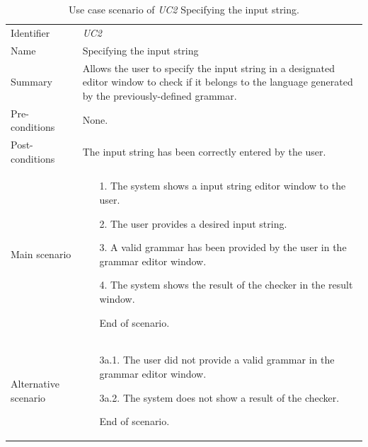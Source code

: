 \documentclass[english,engineering]{wizthesis}
\begin{document}
\begin{xltabular}{\textwidth}{@{}L{3cm}X@{}}
  \caption{Use case scenario of \emph{UC2} Specifying the input string.}
  \label{tab:uc2-scenario}\\
  \toprule
  \endfirsthead
  \endhead
  \endfoot
  \endlastfoot
  Identifier & \emph{UC2} \\
  \addlinespace[0.5em] Name & Specifying the input string \\
  \addlinespace[0.5em] Summary & Allows the user to specify the input string in
  a designated editor window to check if it belongs to the language generated by
  the previously-defined grammar. \\
  \addlinespace[0.5em] Pre-conditions & None. \\
  \addlinespace[0.5em] Post-conditions & The input string has been correctly
  entered by the user. \\
  \addlinespace[0.5em] Main scenario &
  \begin{enumerate}[noitemsep,nolistsep,labelindent=0.5cm,align=right]
    \item [1.] The system shows a input string editor window to the user.
    \item [2.] The user provides a desired input string.
    \item [3.] A valid grammar has been provided by the user in the grammar
    editor window.
    \item [4.] The system shows the result of the checker in the result window.
    \item [] End of scenario.
  \end{enumerate} \\
  \addlinespace[0.5em] Alternative scenario &
  \begin{enumerate}[noitemsep,nolistsep,labelindent=0.5cm,align=right]
    \item [3a.1.] The user did not provide a valid grammar in the grammar editor
    window.
    \item [3a.2.] The system does not show a result of the checker.
    \item [] End of scenario.
  \end{enumerate} \\* \bottomrule
\end{xltabular}
\end{document}
